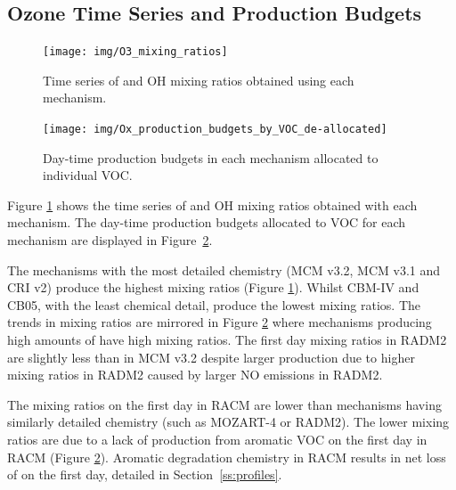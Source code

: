 
\subsection[O3 Time Series and Ox Production Budgets]{Ozone Time Series and  Production Budgets} \label{ss:O3_time_series}

\begin{figure}
    \centering
    \texttt{[image: img/O3\_mixing\_ratios]}
    \vspace{1mm}
    \caption{Time series of  and OH mixing ratios obtained using each mechanism.}
    \vspace{-4mm}
    \label{f:time_series}
\end{figure}

\begin{figure}
    \centering
    \texttt{[image: img/Ox\_production\_budgets\_by\_VOC\_de-allocated]}
    \vspace{1mm}
    \caption{Day-time  production budgets in each mechanism allocated to individual VOC.}
    \vspace{-4mm}
    \label{f:Ox_tagged_budgets}
\end{figure}

Figure \ref{f:time_series} shows the time series of  and OH mixing ratios obtained with each mechanism.
The day-time  production budgets allocated to VOC for each mechanism are displayed in \mbox{Figure \ref{f:Ox_tagged_budgets}}.

The mechanisms with the most detailed chemistry (MCM v3.2, MCM v3.1 and CRI v2) produce the highest  mixing ratios (Figure \ref{f:time_series}).
Whilst CBM-IV and CB05, with the least chemical detail, produce the lowest  mixing ratios.
The trends in  mixing ratios are mirrored in Figure \ref{f:Ox_tagged_budgets} where mechanisms producing high amounts of  have high  mixing ratios.
The first day  mixing ratios in RADM2 are slightly less than in MCM v3.2 despite larger  production due to higher  mixing ratios in RADM2 caused by larger NO emissions in RADM2.

The  mixing ratios on the first day in RACM are lower than mechanisms having similarly detailed chemistry (such as MOZART-4 or RADM2).
The lower  mixing ratios are due to a lack of  production from aromatic VOC on the first day in RACM (Figure \ref{f:Ox_tagged_budgets}).
Aromatic degradation chemistry in RACM results in net loss of  on the first day, detailed in \mbox{Section \ref{ss:profiles}}.

